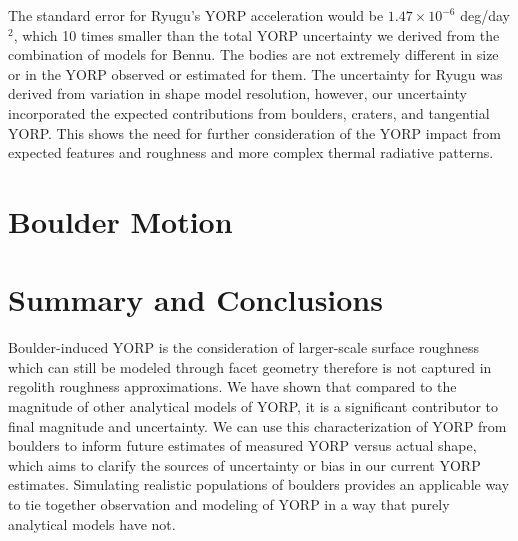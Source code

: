The standard error for Ryugu's YORP acceleration would be $1.47 \times 10^{-6}$ deg/day$^2$, which 10 times smaller than the total YORP uncertainty we derived from the combination of models for Bennu. The bodies are not extremely different in size or in the YORP observed or estimated for them. The uncertainty for Ryugu was derived from variation in shape model resolution, however, our uncertainty incorporated the expected contributions from boulders, craters, and tangential YORP. This shows the need for further consideration of the YORP impact from expected features and roughness and more complex thermal radiative patterns. 

\section{Boulder Motion}



\section{Summary and Conclusions} \label{conclusion}
Boulder-induced YORP is the consideration of larger-scale surface roughness which can still be modeled through facet geometry therefore is not captured in regolith roughness approximations. We have shown that compared to the magnitude of other analytical models of YORP, it is a significant contributor to final magnitude and uncertainty. We can use this characterization of YORP from boulders to inform future estimates of measured YORP versus actual shape, which aims to clarify the sources of uncertainty or bias in our current YORP estimates. Simulating realistic populations of boulders provides an applicable way to tie together observation and modeling of YORP in a way that purely analytical models have not.

